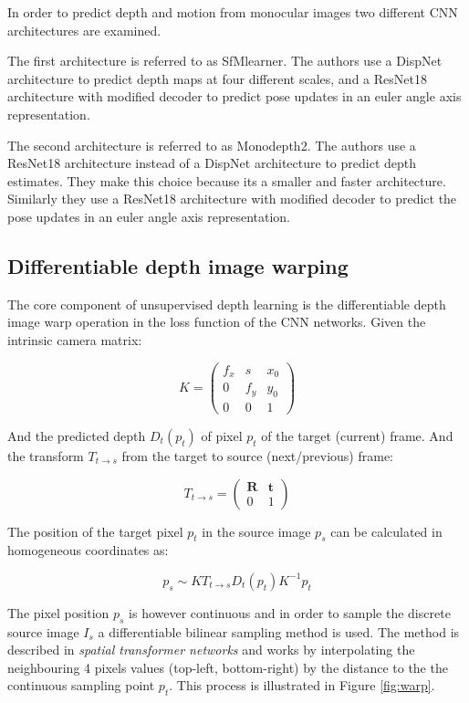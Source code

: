 In order to predict depth and motion from monocular images two different CNN architectures are examined.

The first architecture is referred to as SfMlearner\cite{sfmlearner}. The authors use a DispNet\cite{dispnet} architecture to predict depth maps at four different scales, and a ResNet18\cite{resnet} architecture with modified decoder to predict pose updates in an euler angle axis representation.

The second architecture is referred to as Monodepth2\cite{monodepth2}. The authors use a ResNet18 architecture instead of a DispNet architecture to predict depth estimates. They make this choice because its a smaller and faster architecture. Similarly they use a ResNet18 architecture with modified decoder to predict the pose updates in an euler angle axis representation.

\subsection{Differentiable depth image warping}
\label{sec:diffwarp}

The core component of unsupervised depth learning is the differentiable depth image warp operation in the loss function of the CNN networks. Given the intrinsic camera matrix:

\[
K = 
\begin{pmatrix}
f_x & s & x_0 \\
0 & f_y & y_0 \\
0 & 0   & 1
\end{pmatrix}
\]

And the predicted depth $ D_t(p_t) $ of pixel $ p_t $ of the target (current) frame. And the transform $ T_{t \rightarrow s} $ from the target to source (next/previous) frame:

\[
T_{t \rightarrow s} =
\begin{pmatrix}
\textbf{R} & \textbf{t} \\
0 & 1
\end{pmatrix}
\]

The position of the target pixel $ p_t $ in the source image $ p_s $ can be calculated in homogeneous coordinates as:

\[
p_s \sim K T_{t \rightarrow s} D_t(p_t) K^{-1} p_t 
\]

The pixel position $ p_s $ is however continuous and in order to sample the discrete source image $ I_s $ a differentiable bilinear sampling method is used. The method is described in \textit{spatial transformer networks}\cite{spatialtransformernetworks} and works by interpolating the neighbouring 4 pixels values (top-left, bottom-right) by the distance to the the continuous sampling point $ p_t $. This process is illustrated in Figure \ref{fig:warp}.



